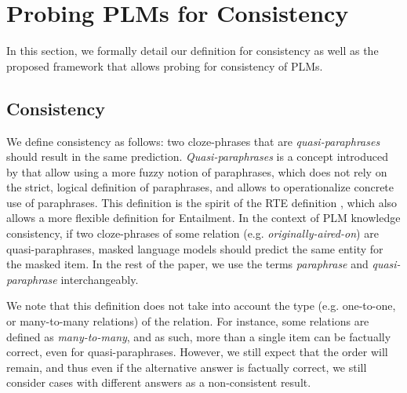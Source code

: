 \section{Probing PLMs for Consistency}
\label{sec:probe}

In this section, we formally detail our definition for consistency as well as the proposed framework that allows probing for consistency of PLMs.

\subsection{Consistency}
We define consistency as follows: two cloze-phrases that are \textit{quasi-paraphrases} should result in the same prediction.
\textit{Quasi-paraphrases} is a concept introduced by \citet{what_is_paraphrase} that allow using a more fuzzy notion of paraphrases, which does not rely on the strict, logical definition of paraphrases, and allows to operationalize concrete use of paraphrases. This definition is  the spirit of the RTE definition \cite{dagan-rte}, which also allows a more flexible definition for Entailment.
In the context of PLM knowledge consistency, if two cloze-phrases of some relation (e.g. \textit{originally-aired-on}) are quasi-paraphrases, masked language models should predict the same entity for the masked item. 
In the rest of the paper, we use the terms \textit{paraphrase} and \textit{quasi-paraphrase} interchangeably.

 

We note that this definition does not take into account the type (e.g. one-to-one, or many-to-many relations) of the relation.%
For instance, some relations are defined as \textit{many-to-many}, and as such, more than a single item can be factually correct, even for quasi-paraphrases. However, we still expect that the order will remain, and thus even if the alternative answer is factually correct, we still consider cases with different answers as a non-consistent result.


